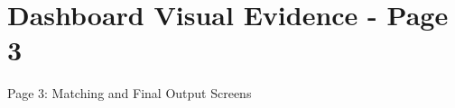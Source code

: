\clearpage
\section*{Dashboard Visual Evidence - Page 3}
\thispagestyle{empty}
\begin{center}
{\Large Page 3: Matching and Final Output Screens}\\[0.6cm]
\begin{minipage}[t]{0.47\textwidth}
\centering
{}
\end{minipage}
\hfill
\begin{minipage}[t]{0.47\textwidth}
\centering
{}
\end{minipage}
\end{center}
